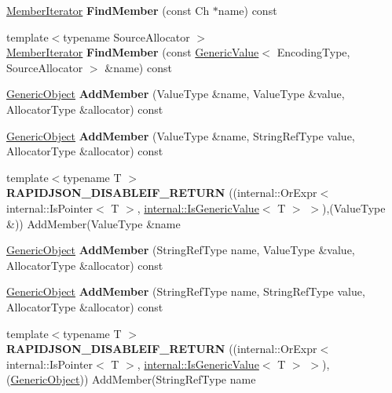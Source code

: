 \begin{DoxyCompactItemize}
\item 
\mbox{\label{a02080_a979890ccb3b116af19f9e3e77d3d286f}} 
\hyperlink{a02004}{Member\+Iterator} {\bfseries Find\+Member} (const Ch $\ast$name) const
\item 
\mbox{\label{a02080_a12a4fbbf2219d6bb43c3d61923830ab4}} 
{\footnotesize template$<$typename Source\+Allocator $>$ }\\\hyperlink{a02004}{Member\+Iterator} {\bfseries Find\+Member} (const \hyperlink{a01992}{Generic\+Value}$<$ Encoding\+Type, Source\+Allocator $>$ \&name) const
\item 
\mbox{\label{a02080_a3668524c8566c46cbae97d938064f5fa}} 
\hyperlink{a02080}{Generic\+Object} {\bfseries Add\+Member} (Value\+Type \&name, Value\+Type \&value, Allocator\+Type \&allocator) const
\item 
\mbox{\label{a02080_ae871adc8c906a72878b7cf5df279ed1f}} 
\hyperlink{a02080}{Generic\+Object} {\bfseries Add\+Member} (Value\+Type \&name, String\+Ref\+Type value, Allocator\+Type \&allocator) const
\item 
\mbox{\label{a02080_a98ebcec632c41442d89cd8634b7ecc47}} 
{\footnotesize template$<$typename T $>$ }\\{\bfseries R\+A\+P\+I\+D\+J\+S\+O\+N\+\_\+\+D\+I\+S\+A\+B\+L\+E\+I\+F\+\_\+\+R\+E\+T\+U\+RN} ((internal\+::\+Or\+Expr$<$ internal\+::\+Is\+Pointer$<$ T $>$, \hyperlink{a02020}{internal\+::\+Is\+Generic\+Value}$<$ T $>$ $>$),(Value\+Type \&)) Add\+Member(Value\+Type \&name
\item 
\mbox{\label{a02080_a011a0dd06baf841e3f6e21a3c95db3c1}} 
\hyperlink{a02080}{Generic\+Object} {\bfseries Add\+Member} (String\+Ref\+Type name, Value\+Type \&value, Allocator\+Type \&allocator) const
\item 
\mbox{\label{a02080_a3af43681aea03c4313d689bcbf5e3363}} 
\hyperlink{a02080}{Generic\+Object} {\bfseries Add\+Member} (String\+Ref\+Type name, String\+Ref\+Type value, Allocator\+Type \&allocator) const
\item 
\mbox{\label{a02080_af361a4b677882964789201fc605541d0}} 
{\footnotesize template$<$typename T $>$ }\\{\bfseries R\+A\+P\+I\+D\+J\+S\+O\+N\+\_\+\+D\+I\+S\+A\+B\+L\+E\+I\+F\+\_\+\+R\+E\+T\+U\+RN} ((internal\+::\+Or\+Expr$<$ internal\+::\+Is\+Pointer$<$ T $>$, \hyperlink{a02020}{internal\+::\+Is\+Generic\+Value}$<$ T $>$ $>$),(\hyperlink{a02080}{Generic\+Object})) Add\+Member(String\+Ref\+Type name

\end{DoxyCompactItemize}
